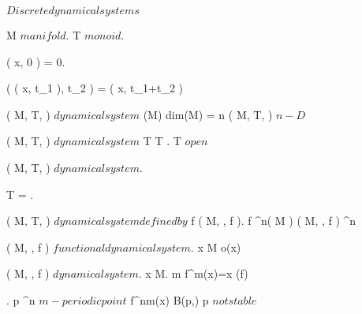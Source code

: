 \documentclass[../Main/main]{subfiles}
\begin{document}
\unit{ $ Discrete dynamical systems $ }
{	
	
	{
		{
			M $ manifold $.
			T $ monoid $.

		}
		{
			{
				\phi( x, 0 ) = 0.

				{
					\phi( \phi( x, t_1 ), t_2 ) = \phi( x, t_1+t_2 )
				}
			}
		}

	}
	{
		{
			( M, T, \phi ) $ dynamical system $
		}
		{
			\dim(M)
		}
		\denote
		{
			dim(M) = n \as ( M, T, \phi ) $ n-D $
		}
	}


	{
		{
			( M, T, \phi ) $ dynamical system $
		}
		{
			T \countable
		}
		{
			T \subset \R.
			T $ open $
		}
	}


	{
		{
			( M, T, \phi ) $ dynamical system $.
		}
		{
			T = \N.

		}
		\denote
		{
			( M, T, \phi ) $ dynamical system defined by $ f \as ( M, \N, f ).
			f \in \Cc^n( M ) \as ( M, \N, f ) \hspace{5pt} \Cc^n 
		}
	}
	
	
	{
		{
			( M, \N, f ) $ functional dynamical system $.
			x \in M
		}
		{
		}
		\denote
		{
			o(x)
		}
	}
	
	
	{
		{
			( M, \N, f ) $ dynamical system $.
			x \in M.
			m \in \N
		}
		{
			f^m(x)=x
		}
		\denote
		{
			 \as \fixed(f)
		}
	}


	{
		{
			.
			p \in \R^n $ m-periodic point $
		}
		{
			\all{ \epsilon \in \R^+ }
			{
				\ex{ \delta \in \R^+ }
				{
					{
						{
							f^{nm}(x) \in B(p,\epsilon)
						}
					}
				}
			}
		}
		{
			p $ not stable $
		}
	}
	
}
\end{document}
